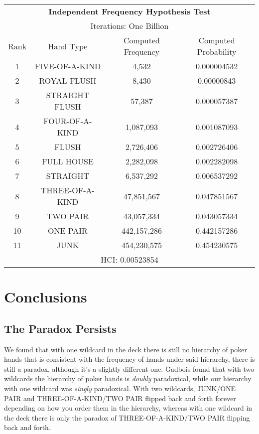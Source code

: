 \documentclass[16pt]{article}
\begin{document}
\begin{center}
\begin{tabular}{ |c c c c|} 
\hline
\multicolumn{4}{|c|}{\textbf{Independent Frequency Hypothesis Test}} \\
\multicolumn{4}{|c|}{Iterations: One Billion} \\
 \hline
 Rank & Hand Type & Computed Frequency & Computed Probability \\ 
 \hline
 1 & FIVE-OF-A-KIND & 4,532 & 0.000004532\\ 
 2 & ROYAL FLUSH & 8,430 & 0.00000843\\ 
 3 & STRAIGHT FLUSH & 57,387 & 0.000057387\\
 4 & FOUR-OF-A-KIND & 1,087,093 & 0.001087093\\
 5 & FLUSH & 2,726,406 & 0.002726406\\
 6 & FULL HOUSE & 2,282,098 & 0.002282098\\
 7 & STRAIGHT & 6,537,292 & 0.006537292\\
 8 & THREE-OF-A-KIND & 47,851,567 & 0.047851567\\
 9 & TWO PAIR & 43,057,334 & 0.043057334\\
 10 & ONE PAIR & 442,157,286 & 0.442157286\\
 11 & JUNK & 454,230,575 & 0.454230575\\
 \hline
 \multicolumn{4}{|c|}{HCI: 0.00523854} \\
 \hline
\end{tabular}
\end{center}

\section{Conclusions}
\subsection{The Paradox Persists}
We found that with one wildcard in the deck there is still no hierarchy of poker hands that is consistent with the frequency of hands under said hierarchy, there is still a paradox, although it's a slightly different one. Gadbois found that with two wildcards the hierarchy of poker hands is \textit{doubly} paradoxical, while our hierarchy with one wildcard was \textit{singly} paradoxical. With two wildcards, JUNK/ONE PAIR and THREE-OF-A-KIND/TWO PAIR flipped back and forth forever depending on how you order them in the hierarchy, whereas with one wildcard in the deck there is only the paradox of THREE-OF-A-KIND/TWO PAIR flipping back and forth.
\end{document}
